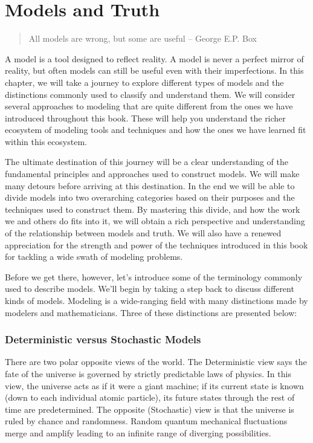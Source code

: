 \documentclass[]{memoir}
\begin{document}
\chapter{Models and Truth}

\begin{quote}
All models are wrong, but some are useful -- George E.P. Box
\end{quote}

A model is a tool designed to reflect reality. A model is never a
perfect mirror of reality, but often models can still be useful even
with their imperfections. In this chapter, we will take a journey to
explore different types of models and the distinctions commonly used to
classify and understand them. We will consider several approaches to
modeling that are quite different from the ones we have introduced
throughout this book. These will help you understand the richer
ecosystem of modeling tools and techniques and how the ones we have
learned fit within this ecosystem.

The ultimate destination of this journey will be a clear understanding
of the fundamental principles and approaches used to construct models.
We will make many detours before arriving at this destination. In the
end we will be able to divide models into two overarching categories
based on their purposes and the techniques used to construct them. By
mastering this divide, and how the work we and others do fits into it,
we will obtain a rich perspective and understanding of the relationship
between models and truth. We will also have a renewed appreciation for
the strength and power of the techniques introduced in this book for
tackling a wide swath of modeling problems.

Before we get there, however, let's introduce some of the terminology
commonly used to describe models. We'll begin by taking a step back to
discuss different kinds of models. Modeling is a wide-ranging field with
many distinctions made by modelers and mathematicians. Three of these
distinctions are presented below:

\subsection{Deterministic versus Stochastic Models}

There are two polar opposite views of the world. The Deterministic view
says the fate of the universe is governed by strictly predictable laws
of physics. In this view, the universe acts as if it were a giant
machine; if its current state is known (down to each individual atomic
particle), its future states through the rest of time are predetermined.
The opposite (Stochastic) view is that the universe is ruled by chance
and randomness. Random quantum mechanical fluctuations merge and amplify
leading to an infinite range of diverging possibilities.
\end{document}
